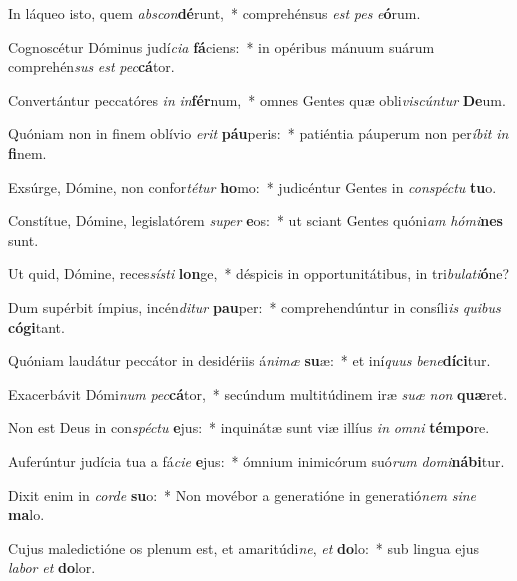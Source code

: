 \item In láqueo isto, quem \textit{abs}\textit{con}\textbf{dé}runt,~* comprehénsus \textit{est} \textit{pes} \textit{e}\textbf{ó}rum.
\item Cognoscétur Dóminus judí\textit{ci}\textit{a} \textbf{fá}ciens:~* in opéribus mánuum suárum comprehén\textit{sus} \textit{est} \textit{pec}\textbf{cá}tor.
\item Convertántur peccatóres \textit{in} \textit{in}\textbf{fér}num,~* omnes Gentes quæ obli\textit{vis}\textit{cún}\textit{tur} \textbf{De}um.
\item Quóniam non in finem oblívio \textit{e}\textit{rit} \textbf{páu}peris:~* patiéntia páuperum non per\textit{í}\textit{bit} \textit{in} \textbf{fi}nem.
\item Exsúrge, Dómine, non confor\textit{té}\textit{tur} \textbf{ho}mo:~* judicéntur Gentes in \textit{con}\textit{spéc}\textit{tu} \textbf{tu}o.
\item Constítue, Dómine, legislatórem \textit{su}\textit{per} \textbf{e}os:~* ut sciant Gentes quóni\textit{am} \textit{hó}\textit{mi}\textbf{nes} sunt.
\item Ut quid, Dómine, reces\textit{sís}\textit{ti} \textbf{lon}ge,~* déspicis in opportunitátibus, in tri\textit{bu}\textit{la}\textit{ti}\textbf{ó}ne?
\item Dum supérbit ímpius, incén\textit{di}\textit{tur} \textbf{pau}per:~* comprehendúntur in consíli\textit{is} \textit{qui}\textit{bus} \textbf{có}\textbf{gi}tant.
\item Quóniam laudátur peccátor in desidériis á\textit{ni}\textit{mæ} \textbf{su}æ:~* et iní\textit{quus} \textit{be}\textit{ne}\textbf{dí}\textbf{ci}tur.
\item Exacerbávit Dómi\textit{num} \textit{pec}\textbf{cá}tor,~* secúndum multitúdinem iræ \textit{su}\textit{æ} \textit{non} \textbf{quæ}ret.
\item Non est Deus in con\textit{spéc}\textit{tu} \textbf{e}jus:~* inquinátæ sunt viæ illíus \textit{in} \textit{om}\textit{ni} \textbf{tém}\textbf{po}re.
\item Auferúntur judícia tua a fá\textit{ci}\textit{e} \textbf{e}jus:~* ómnium inimicórum suó\textit{rum} \textit{do}\textit{mi}\textbf{ná}\textbf{bi}tur.
\item Dixit enim in \textit{cor}\textit{de} \textbf{su}o:~* Non movébor a generatióne in generatió\textit{nem} \textit{si}\textit{ne} \textbf{ma}lo.
\item Cujus maledictióne os plenum est, et amaritúdi\textit{ne}, \textit{et} \textbf{do}lo:~* sub lingua ejus \textit{la}\textit{bor} \textit{et} \textbf{do}lor.
